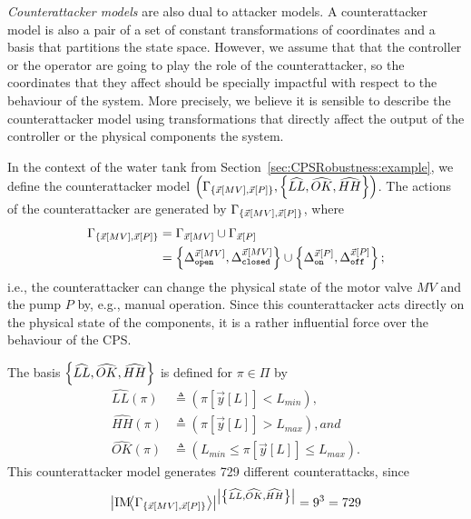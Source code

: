 {{\emph{Counterattacker models} are also dual to attacker models. A counterattacker model is also a pair of a set of constant transformations of coordinates and a basis that partitions the state space. However, we assume that that the controller or the operator are going to play the role of the counterattacker, so the coordinates that they affect should be specially impactful with respect to the behaviour of the system. More precisely, we believe it is sensible to describe the counterattacker model using transformations that directly affect the output of the controller or the physical components the system. 
\begin{example}
  \label{ex:CPSRobustness:counterattack}
  In the context of the water tank from Section~\ref{sec:CPSRobustness:example}, we define the counterattacker model $\left(\Gamma_{\left\{\vec{x}[MV],\vec{x}[P]\right\}},\left\{\widehat{LL},\widehat{OK},\widehat{HH}\right\}\right)$. The actions of the counterattacker are generated by $\Gamma_{\left\{\vec{x}[MV],\vec{x}[P]\right\}}$, where 
  \begin{align*}
    \Gamma_{\left\{\vec{x}[MV],\vec{x}[P]\right\}}&=\Gamma_{\vec{x}[MV]}\cup\Gamma_{\vec{x}[P]}\\
    &=\left\{{\Delta}^{\vec{x}[MV]}_{\texttt{open}},{\Delta}^{\vec{x}[MV]}_{\texttt{closed}}\right\}\cup \left\{{\Delta}^{\vec{x}[P]}_{\texttt{on}},{\Delta}^{\vec{x}[P]}_{\texttt{off}}\right\};
  \end{align*}
i.e., the counterattacker can change the physical state of the motor valve $MV$ and the pump $P$ by, e.g., manual operation. Since this counterattacker acts directly on the physical state of the components, it is a rather influential force over the behaviour of the CPS.

The basis $\left\{\widehat{LL},\widehat{OK},\widehat{HH}\right\}$ is defined for $\pi\in \Pi$ by 
  \begin{align*}
    \widehat{LL}(\pi)&\triangleq(\pi[\vec{y}[L]]<L_{min}),
    \\\widehat{HH}(\pi)&\triangleq(\pi[\vec{y}[L]]>L_{max}), and\\
    \widehat{OK}(\pi)&\triangleq(L_{min}\leq \pi[\vec{y}[L]]\leq L_{max}).
  \end{align*}
  This counterattacker model generates 729 different counterattacks, 
  since
  \begin{align*}
    \left| \text{IM}\!{{\left<\Gamma_{\left\{\vec{x}[MV],\vec{x}[P]\right\}}\right>}}\right|^{\left|\left\{\widehat{LL},\widehat{OK},\widehat{HH}\right\}\right|}=9^3=729
  \end{align*}


\end{example}}}

